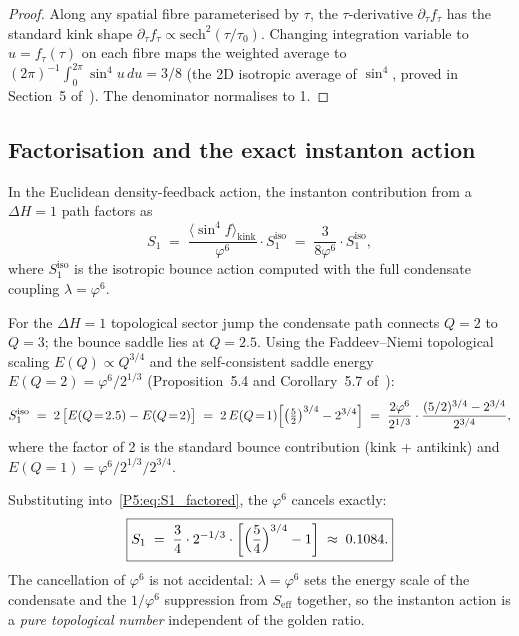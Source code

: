 \documentclass[11pt,a4paper]{article}
\theoremstyle{definition}
\theoremstyle{remark}
\newcommand{\vp}{\varphi}
\newcommand{\lam}{\lambda}
\begin{document}
\begin{proof}
Along any spatial fibre parameterised by $\tau$, the $\tau$-derivative
$\partial_\tau f_\tau$ has the standard kink shape
$\partial_\tau f_\tau \propto \mathrm{sech}^2(\tau/\tau_0)$.
Changing integration variable to $u = f_\tau(\tau)$ on each fibre
maps the weighted average to $(2\pi)^{-1}\int_0^{2\pi}\sin^4\!u\,du = 3/8$
(the 2D isotropic average of $\sin^4$, proved in Section~5 of~\cite{Paper1}).
The denominator normalises to 1. 
\end{proof}

\subsection{Factorisation and the exact instanton action}

In the Euclidean density-feedback action, the instanton contribution
from a $\Delta H=1$ path factors as
\begin{equation}
  S_1
  \;=\; \frac{\langle\sin^4\!f\rangle_{\mathrm{kink}}}{\vp^6}
        \cdot S_1^{\mathrm{iso}}
  \;=\; \frac{3}{8\vp^6}\cdot S_1^{\mathrm{iso}},
  \label{P5:eq:S1_factored}
\end{equation}
where $S_1^{\mathrm{iso}}$ is the isotropic bounce action computed with
the full condensate coupling $\lam=\vp^6$.

For the $\Delta H=1$ topological sector jump the condensate path connects
$Q=2$ to $Q=3$; the bounce saddle lies at $Q=2.5$.
Using the Faddeev--Niemi topological scaling $E(Q)\propto Q^{3/4}$
and the self-consistent saddle energy
$E(Q\!=\!2)=\vp^6/2^{1/3}$ (Proposition~5.4 and
Corollary~5.7 of~\cite{Paper1}):
\begin{equation}
  S_1^{\mathrm{iso}}
  \;=\; 2\,\bigl[E(Q\!=\!2.5)-E(Q\!=\!2)\bigr]
  \;=\; 2\,E(Q\!=\!1)\Bigl[\bigl(\tfrac{5}{2}\bigr)^{3/4}-2^{3/4}\Bigr]
  \;=\; \frac{2\vp^6}{2^{1/3}}\cdot\frac{(5/2)^{3/4}-2^{3/4}}{2^{3/4}},
  \label{P5:eq:S1_iso}
\end{equation}
where the factor of 2 is the standard bounce contribution
(kink + antikink) and $E(Q\!=\!1)=\vp^6/2^{1/3}/2^{3/4}$.

Substituting into~\eqref{P5:eq:S1_factored}, the $\vp^6$ cancels exactly:
\begin{equation}
  \boxed{S_1
  \;=\; \frac{3}{4}\cdot 2^{-1/3}
        \cdot\left[\Bigl(\frac{5}{4}\Bigr)^{3/4}-1\right]
  \;\approx\; 0.1084.}
  \label{P5:eq:S1_exact}
\end{equation}
The cancellation of $\vp^6$ is not accidental: $\lam=\vp^6$ sets the
energy scale of the condensate and the $1/\vp^6$ suppression from
$S_{\mathrm{eff}}$ together, so the instanton action is a \emph{pure
topological number} independent of the golden ratio.
\end{document}
